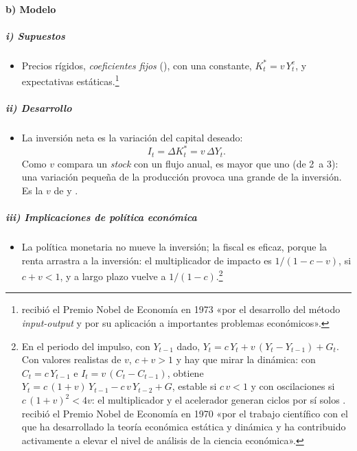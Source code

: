 \documentclass[11pt]{article}
\begin{document}
\paragraph{b) Modelo}

\subparagraph{i) Supuestos}

\begin{itemize}
\item Precios rígidos, \emph{coeficientes fijos} (), con una  constante, $K^*_t=v\,Y^e_t$, y expectativas estáticas.\footnote{ recibió el Premio Nobel de Economía en 1973 «por el desarrollo del método \emph{input-output} y por su aplicación a importantes problemas económicos»\nocite{Nobel1973Leontief}.}
\end{itemize}

\subparagraph{ii) Desarrollo}

\begin{itemize}
\item La inversión neta es la variación del capital deseado:
  \begin{equation}
  I_t=\Delta K^*_t=v\,\Delta Y_t.\label{eq:acelerador}
  \end{equation}
  Como $v$ compara un \emph{stock} con un flujo anual, es mayor que uno (de 2~a 3): una variación pequeña de la producción provoca una grande de la inversión. Es la $v$ de  y  .
\end{itemize}

\subparagraph{iii) Implicaciones de política económica}

\begin{itemize}
\item La política monetaria no mueve la inversión; la fiscal es eficaz, porque la renta arrastra a la inversión: el multiplicador de impacto es $1/(1-c-v)$, si $c+v<1$, y a largo plazo vuelve a $1/(1-c)$.\footnote{En el periodo del impulso, con $Y_{t-1}$ dado, $Y_t=c\,Y_t+v\,(Y_t-Y_{t-1})+G_t$. Con valores realistas de $v$, $c+v>1$ y hay que mirar la dinámica: con $C_t=c\,Y_{t-1}$ e $I_t=v\,(C_t-C_{t-1})$, \textcite{Samuelson1939Interactions} obtiene $Y_t=c\,(1+v)\,Y_{t-1}-c\,v\,Y_{t-2}+G$, estable si $c\,v<1$ y con oscilaciones si $c\,(1+v)^2<4v$: el multiplicador y el acelerador generan ciclos por sí solos .  recibió el Premio Nobel de Economía en 1970 «por el trabajo científico con el que ha desarrollado la teoría económica estática y dinámica y ha contribuido activamente a elevar el nivel de análisis de la ciencia económica»\nocite{Nobel1970Samuelson}.}
\end{itemize}
\end{document}
